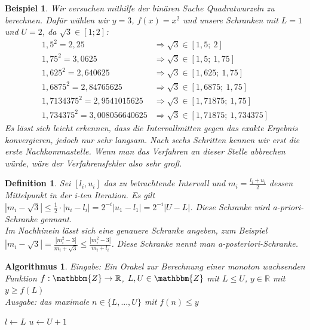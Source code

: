 \documentclass[12pt]{article}
\newcommand{\Z}{\mathbbm{Z}} %
\newcommand{\R}{\mathbb{R}} %
\newtheorem{definition}[satz]{Definition}
\newtheorem{beispiel}[satz]{Beispiel}
\newtheorem{algorithmus}[satz]{Algorithmus}
\begin{document}
\begin{beispiel}
   Wir versuchen mithilfe der binären Suche Quadratwurzeln zu berechnen. Dafür wählen wir $y=3$, $f(x)=x^2$ und unsere Schranken mit $L=1$ und $U=2$, da $\sqrt{3} \in [1;2]$: \\ 
   \begin{align*}
       1,5^2=2,25 &\Rightarrow \sqrt{3} \in [1,5; \: 2] \\
       1,75^2=3,0625 &\Rightarrow \sqrt{3} \in [1,5; \: 1,75] \\ 
       1,625^2=2,640625 &\Rightarrow \sqrt{3} \in [1,625; \: 1,75] \\
       1,6875^2=2,84765625 &\Rightarrow \sqrt{3} \in [1,6875; \: 1,75] \\
       1,7134375^2=2,9541015625 &\Rightarrow \sqrt{3} \in [1,71875; \: 1,75] \\
       1,734375^2=3,008056640625 &\Rightarrow \sqrt{3} \in [1,71875; \: 1,734375]
   \end{align*}
   Es lässt sich leicht erkennen, dass die Intervallmitten gegen das exakte Ergebnis konvergieren, jedoch nur sehr langsam. Nach sechs Schritten kennen wir erst die erste Nachkommastelle. Wenn man das Verfahren an dieser Stelle abbrechen würde, wäre der Verfahrensfehler also sehr groß.
   \label{binäre suche}
\end{beispiel}

\begin{definition}
    Sei $[l_i,u_i]$ das zu betrachtende Intervall und $m_i= \frac{l_i+u_i}{2}$ dessen Mittelpunkt in der i-ten Iteration. 
    Es gilt $|m_i-\sqrt{3}|\leq \frac{1}{2} \cdot|u_i-l_i|=2^{-i}|u_1-l_1|= 2^{-i}|U-L|$.
    Diese Schranke wird a-priori-Schranke gennant. \\
    Im Nachhinein lässt sich eine genauere Schranke angeben, zum Beispiel $|m_i-\sqrt{3}|=\frac{|m_i^2-3|}{m_i+ \sqrt{3}}\leq \frac{|m_i^2-3|}{m_i+l_i}$. Diese Schranke nennt man a-posteriori-Schranke. 
\end{definition}

\begin{algorithmus}
    Eingabe: Ein Orakel zur Berechnung einer monoton wachsenden Funktion $f: \Z \to \R$, $L,U \in \Z$ mit $L\leq U$, $y \in \R$ mit $y \geq f(L)$ \\ 
    Ausgabe: das maximale $n \in \{L,...,U\}$ mit $f(n) \leq y$

\begin{algorithm}
$l \gets L$\;
$u \gets U+1$\;
\end{algorithm}
\end{algorithmus}
\end{document}
